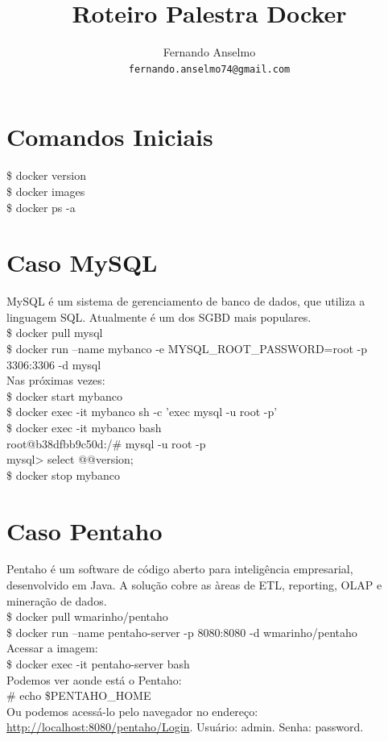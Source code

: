 \documentclass[a4paper,11pt]{article}
\title{Roteiro Palestra Docker}
\author{
  Fernando Anselmo \\
  \texttt{fernando.anselmo74@gmail.com} \\
}
\begin{document}
\maketitle

\section*{Comandos Iniciais}
{\ttfamily\$ docker version} \\
{\ttfamily\$ docker images} \\
{\ttfamily\$ docker ps -a}

\section{Caso MySQL}
MySQL é um sistema de gerenciamento de banco de dados, que utiliza a linguagem SQL. Atualmente é um dos SGBD mais populares. \\
{\ttfamily\$ docker pull mysql} \\
{\ttfamily\$ docker run --name mybanco -e MYSQL\_ROOT\_PASSWORD=root -p 3306:3306 -d mysql} \\[2mm]
Nas próximas vezes: \\
{\ttfamily\$ docker start mybanco} \\
{\ttfamily\$ docker exec -it mybanco sh -c 'exec mysql -u root -p'} \\
{\ttfamily\$ docker exec -it mybanco bash} \\
{\ttfamily root@b38dfbb9c50d:/\# mysql -u root -p} \\
{\ttfamily mysql> select @@version;} \\
{\ttfamily\$ docker stop mybanco}

\section{Caso Pentaho}
Pentaho é um software de código aberto para inteligência empresarial, desenvolvido em Java. A solução cobre as àreas de ETL, reporting, OLAP e mineração de dados. \\
{\ttfamily\$ docker pull wmarinho/pentaho} \\
{\ttfamily\$ docker run --name pentaho-server -p 8080:8080 -d wmarinho/pentaho} \\[2mm]
Acessar a imagem: \\
{\ttfamily\$ docker exec -it pentaho-server bash} \\[2mm]
Podemos ver aonde está o Pentaho: \\
{\ttfamily\# echo \$PENTAHO\_HOME} \\[2mm]
Ou podemos acessá-lo pelo navegador no endereço: \url{http://localhost:8080/pentaho/Login}. Usuário: admin. Senha: password.
\end{document}
